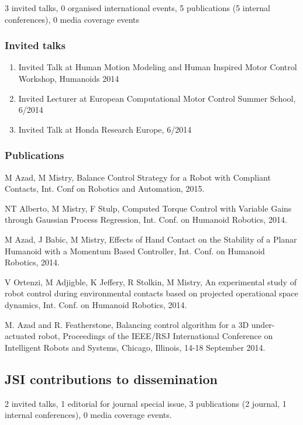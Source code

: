 3 invited talks, 0 organised international events, 5 publications (5 internal conferences), 0 media coverage events

\subsubsection{Invited talks}

\begin{enumerate}
\item Invited Talk at Human Motion Modeling and Human Inspired Motor Control Workshop, Humanoids 2014
\item Invited Lecturer at European Computational Motor Control Summer School, 6/2014
\item Invited Talk at Honda Research Europe, 6/2014
\end{enumerate}

\subsubsection{Publications}

M Azad, M Mistry, Balance Control Strategy for a Robot with Compliant Contacts, Int. Conf on Robotics and Automation, 2015.

NT Alberto, M Mistry, F Stulp, Computed Torque Control with Variable Gains through Gaussian Process Regression, Int. Conf. on Humanoid Robotics, 2014.

M Azad, J Babic, M Mistry, Effects of Hand Contact on the Stability of a Planar Humanoid with a Momentum Based Controller, Int. Conf. on Humanoid Robotics, 2014.

V Ortenzi, M Adjigble, K Jeffery, R Stolkin, M Mistry, An experimental study of robot control during environmental contacts based on projected operational space dynamics, Int. Conf. on Humanoid Robotics, 2014.

M. Azad and R. Featherstone, Balancing control algorithm for a 3D under-actuated robot, Proceedings of the IEEE/RSJ International Conference on Intelligent Robots and Systems, Chicago, Illinois, 14-18 September 2014.

\subsection{JSI contributions to dissemination}

2 invited talks, 1 editorial for journal special issue, 3 publications (2 journal, 1 internal conferences), 0 media coverage events.

